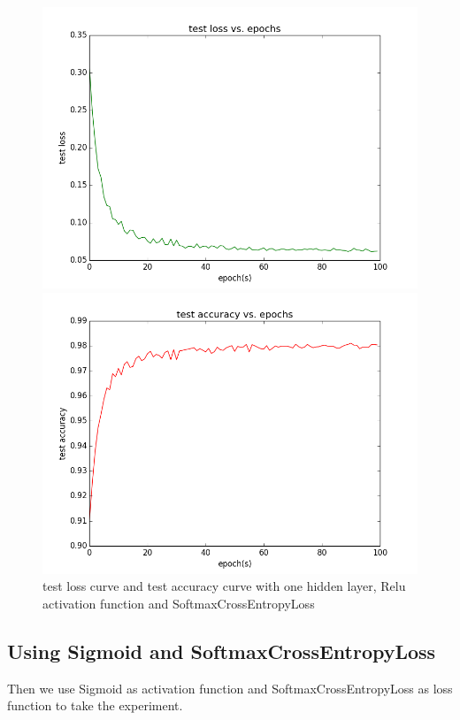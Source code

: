 \documentclass{elegantbook}
\begin{document}
\begin{figure}[!ht]
	\centering
	\begin{minipage}[t]{0.45\textwidth}
		\centering
		\includegraphics[width=\textwidth]{testloss1rs}
	\end{minipage}
	\begin{minipage}[t]{0.45\textwidth}
		\centering
		\includegraphics[width=\textwidth]{testacc1rs}
	\end{minipage}
	\caption{\label{testcurve3}test loss curve and test accuracy curve with one hidden layer, Relu activation function and SoftmaxCrossEntropyLoss}
\end{figure}

\subsection{Using Sigmoid and SoftmaxCrossEntropyLoss}
Then we use Sigmoid as activation function and SoftmaxCrossEntropyLoss as loss function to take the experiment.
\end{document}
